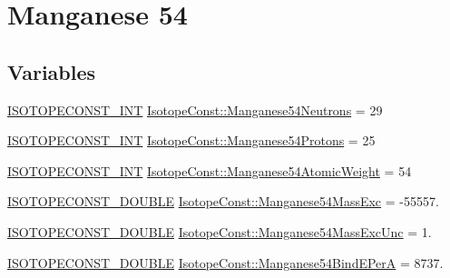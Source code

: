 \hypertarget{group___isotope_const-_manganese-_mn54}{}\section{Manganese 54}
\label{group___isotope_const-_manganese-_mn54}
\subsection*{Variables}
\begin{DoxyCompactItemize}
\item 
\mbox{\hyperlink{group___isotope_const-_macros_ga5f18360b3e99483a35c32d789e62621c}{I\+S\+O\+T\+O\+P\+E\+C\+O\+N\+S\+T\+\_\+\+I\+NT}} \mbox{\hyperlink{group___isotope_const-_manganese-_mn54_gab07274b28c59936288ed9684803e3877}{Isotope\+Const\+::\+Manganese54\+Neutrons}} = 29
\item 
\mbox{\hyperlink{group___isotope_const-_macros_ga5f18360b3e99483a35c32d789e62621c}{I\+S\+O\+T\+O\+P\+E\+C\+O\+N\+S\+T\+\_\+\+I\+NT}} \mbox{\hyperlink{group___isotope_const-_manganese-_mn54_ga76a33c7a7aa77eb043b357b185fb3637}{Isotope\+Const\+::\+Manganese54\+Protons}} = 25
\item 
\mbox{\hyperlink{group___isotope_const-_macros_ga5f18360b3e99483a35c32d789e62621c}{I\+S\+O\+T\+O\+P\+E\+C\+O\+N\+S\+T\+\_\+\+I\+NT}} \mbox{\hyperlink{group___isotope_const-_manganese-_mn54_gad56b64c9fff57f1149fd7527476c4463}{Isotope\+Const\+::\+Manganese54\+Atomic\+Weight}} = 54
\item 
\mbox{\hyperlink{group___isotope_const-_macros_ga8f45a7272ce02c0b4c65c44636ed719a}{I\+S\+O\+T\+O\+P\+E\+C\+O\+N\+S\+T\+\_\+\+D\+O\+U\+B\+LE}} \mbox{\hyperlink{group___isotope_const-_manganese-_mn54_gacb1d8fa387603c8cc259d2c26ebc3451}{Isotope\+Const\+::\+Manganese54\+Mass\+Exc}} = -\/55557.
\item 
\mbox{\hyperlink{group___isotope_const-_macros_ga8f45a7272ce02c0b4c65c44636ed719a}{I\+S\+O\+T\+O\+P\+E\+C\+O\+N\+S\+T\+\_\+\+D\+O\+U\+B\+LE}} \mbox{\hyperlink{group___isotope_const-_manganese-_mn54_gaf5343fd1b9c14c4468861c625f4243a1}{Isotope\+Const\+::\+Manganese54\+Mass\+Exc\+Unc}} = 1.
\item 
\mbox{\hyperlink{group___isotope_const-_macros_ga8f45a7272ce02c0b4c65c44636ed719a}{I\+S\+O\+T\+O\+P\+E\+C\+O\+N\+S\+T\+\_\+\+D\+O\+U\+B\+LE}} \mbox{\hyperlink{group___isotope_const-_manganese-_mn54_gaf3a9a2904fed3f1a4f99b4153f2af44b}{Isotope\+Const\+::\+Manganese54\+Bind\+E\+PerA}} = 8737.
\item 

\end{DoxyCompactItemize}

